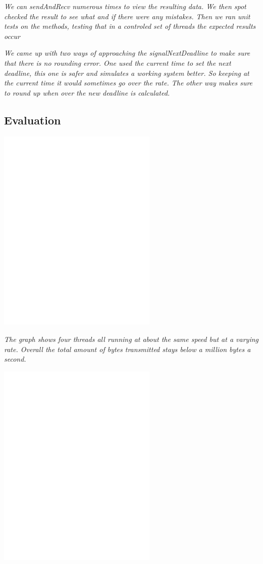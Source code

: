 \documentclass[11pt, letterpaper]{article}
\begin{document}
{\em We can sendAndRecv numerous times to view the resulting data. We then spot checked the result to see what and if there were any mistakes. Then we ran unit tests on the methods, testing that in a controled set of threads the expected results occur}

{\em We came up with two ways of approaching the signalNextDeadline to make sure that there is no rounding error. One used the current time to set the next deadline, this one is safer and simulates a working system better. So keeping at the current time it would sometimes go over the rate. The other way makes sure to round up when over the new deadline is calculated. }


\subsection{Evaluation}

\centerline{\includegraphics[width=3in]{plot2}}

{\em The graph shows four threads all running at about the same speed but at a varying rate. Overall the total amount of bytes transmitted stays below a million bytes a second. }


\centerline{\includegraphics[width=3in]{plot2b}}
\end{document}
